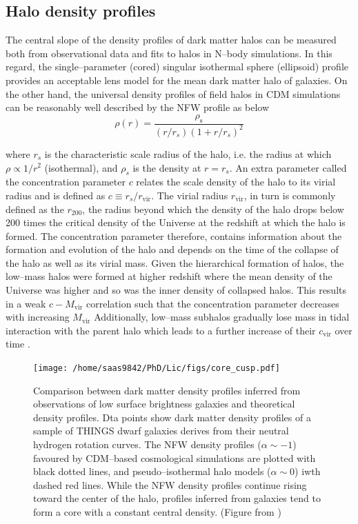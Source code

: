 \documentclass[a4wide,12pt]{book}
\newcommand{\ignore}[1]{}
\begin{document}
{\subsection*{Halo density profiles}
The central slope of the density profiles of dark matter halos can be measured both from observational data and fits to halos in N--body simulations. In this regard, the single--parameter (cored) singular isothermal sphere (ellipsoid) profile provides an acceptable lens model for the mean dark matter halo of galaxies. On the other hand, the universal density profiles of field halos in CDM simulations can be reasonably well described by the NFW profile as below
\begin{equation}
\label{eq:NFW}
\rho(r)=\frac{\rho_\mathrm{s}}{(r/r_s)(1+r/r_s)^{2}}
\end{equation}

where $r_s$ is the characteristic scale radius of the halo, i.e. the radius at which $\rho \propto 1/r^2$ (isothermal), and $\rho_s$ is the density at $r=r_s$. An extra parameter called the concentration parameter $c$ relates the scale density of the halo to its virial radius and is defined as $c\equiv r_s/r_\mathrm{vir}$. The virial radius $r_\mathrm{vir}$, in turn is commonly defined as the $r_{200}$, the radius beyond which the density of the halo drops below 200 times the critical density of the Universe at the redshift at which the halo is formed\ignore{ (more on this in section \ref{subsec:issues or systematic challenge})}. The concentration parameter therefore, contains information about the formation and evolution of the halo and depends on the time of the collapse of the halo as well as its virial mass. Given the hierarchical formation of halos, the low--mass halos were formed at higher redshift where the mean density of the Universe was higher and so was the inner density of collapsed halos. This results in a weak $c-M_\mathrm{vir}$ correlation such that the concentration parameter decreases with increasing $M_\mathrm{vir}$
  Additionally, low--mass subhalos gradually lose mass in tidal interaction with the parent halo which leads to a further increase of their $c_\mathrm{vir}$ over time \citep{Bullock+2001, Maccio+2008}.

\begin{figure}
\label{fig:CDM_WDM_halo}
\centering
\texttt{[image: /home/saas9842/PhD/Lic/figs/core\_cusp.pdf]} %
\caption{Comparison between dark matter density profiles inferred from observations of low surface brightness galaxies and theoretical density profiles. Dta points show dark matter density profiles of a sample of THINGS dwarf galaxies derives from their neutral hydrogen rotation curves. The NFW density profiles ($\alpha\sim -1$) favoured by CDM--based cosmological simulations are plotted with black dotted lines, and pseudo--isothermal halo models ($\alpha\sim 0$) iwth dashed red lines. While the NFW density profiles continue rising toward the center of the halo, profiles inferred from galaxies tend to form a core with a constant central density. (Figure from \citealt[][]{Oh+2011})}
\end{figure}


}
\end{document}
